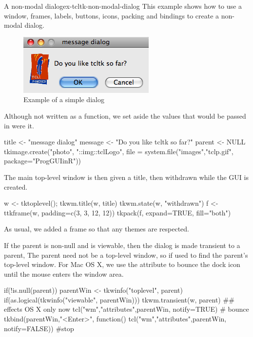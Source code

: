 \begin{example}{A non-modal dialog}{ex-tcltk-non-modal-dialog}
This example shows how to use  a window, frames,  labels, buttons,
icons, packing and bindings to create a non-modal dialog. 

\begin{figure}
  \centering
  \includegraphics[width=.6\textwidth]{fig-tcltk-simple-dialog.png}
  \caption{Example of a simple dialog}
  \label{fig:fig-tcltk-simple-dialog}
\end{figure}

Although not written as a function, we set aside the values that would
be passed in were it.
\begin{Schunk}
\begin{Sinput}
 title <- "message dialog"
 message <- "Do you like tcltk so far?"
 parent <- NULL
 tkimage.create("photo", "::img::tclLogo", 
                file = system.file("images","tclp.gif",
                  package="ProgGUIinR"))
\end{Sinput}
\end{Schunk}

The main top-level window is then given a title, then withdrawn while
the GUI is created. 
\begin{Schunk}
\begin{Sinput}
 w <- tktoplevel(); tkwm.title(w, title)
 tkwm.state(w, "withdrawn")
 f <- ttkframe(w,  padding=c(3, 3, 12, 12))
 tkpack(f, expand=TRUE, fill="both")
\end{Sinput}
\end{Schunk}
As usual, we added a frame so that any themes are respected.

If the parent is non-null and is viewable, then the dialog is made
transient to a parent, The parent need not be a top-level window, so
 if used to find the parent's top-level window. For
Mac OS X, we use the  attribute to bounce the dock icon
until the mouse enters the window area.

\begin{Schunk}
\begin{Sinput}
 if(!is.null(parent)) {
   parentWin <- tkwinfo("toplevel", parent)
   if(as.logical(tkwinfo("viewable", parentWin))) {
     tkwm.transient(w, parent)
     ## effects OS X only now
     tcl("wm","attributes",parentWin, notify=TRUE) # bounce
     tkbind(parentWin,"<Enter>", function() 
       tcl("wm","attributes",parentWin, notify=FALSE)) #stop
   }
 }
\end{Sinput}
\end{Schunk}


\end{example}
